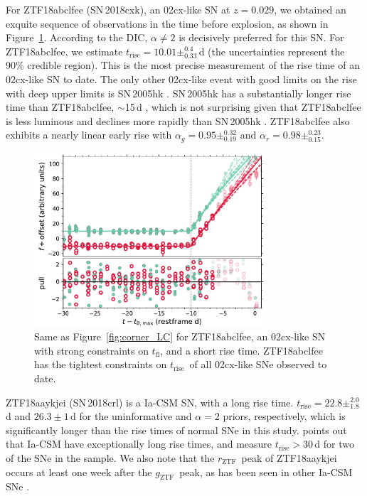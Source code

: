 \documentclass[twocolumn]{./aastex63}
\newcommand{\rztf}{$r_\mathrm{ZTF}$}
\newcommand{\gztf}{$g_\mathrm{ZTF}$}
\newcommand{\tfl}{$t_\mathrm{fl}$}
\newcommand{\trise}{$t_\mathrm{rise}$}
\begin{document}
For ZTF18abclfee (SN\,2018cxk), an 02cx-like SN at $z = 0.029$, we obtained an
exquite sequence of observations in the time before explosion, as shown in
Figure~\ref{fig:02cx}. According to the DIC, $\alpha \ne 2$ is decisively
preferred for this SN. For ZTF18abclfee, we estimate \trise$ = 10.01
\pm^{0.4}_{0.33}$\,d (the uncertainties represent the 90\% credible region).
This is the most precise measurement of the rise time of an 02cx-like SN to
date. The only other 02cx-like event with good limits on the rise with deep
upper limits is SN\,2005hk \citep{Phillips07}. SN\,2005hk has a substantially
longer rise time than ZTF18abclfee, $\sim$15\,d \citep{Phillips07}, which is not
surprising given that ZTF18abclfee is less luminous and declines more rapidly
than SN\,2005hk \citep{Miller17a,Yao19}. ZTF18abclfee also exhibits a nearly
linear early rise with $\alpha_g = 0.95 \pm^{0.32}_{0.19}$ and $\alpha_r = 0.98
\pm^{0.23}_{0.15}$.

\begin{figure}
    \centering
    \includegraphics[width=3.4in]{./figures/ZTF18abclfee_model_lc.pdf}
    \caption{Same as Figure~\ref{fig:corner_LC} for ZTF18abclfee, an 02cx-like
    SN with strong constraints on \tfl, and a short rise time. ZTF18abclfee has
    the tightest constraints on \trise\ of all 02cx-like SNe observed to date.}
    \label{fig:02cx}
\end{figure}

ZTF18aaykjei (SN\,2018crl) is a Ia-CSM SN, with a long rise time. \trise$ = 22.8
\pm^{2.0}_{1.8}$\,d and $26.3 \pm 1$\,d for the uninformative and $\alpha = 2$
priors, respectively, which is significantly longer than the rise times of
normal SNe in this study. \citet{Silverman13} points out that Ia-CSM have
exceptionally long rise times, and \citet{Firth15} measure \trise$ > 30$\,d for
two of the SNe in the \citeauthor{Silverman13} sample. We also note that the
\rztf\ peak of ZTF18aaykjei occurs at least one week after the \gztf\ peak, as
has been seen in other Ia-CSM SNe \citep{aldering05gj,prieto05gj}.
\end{document}
